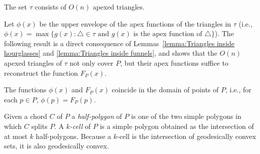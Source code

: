 \documentclass[a4paper,UKenglish]{lipics}
\newcommand{\F}[2]{\ensuremath{F_{\scriptscriptstyle #1}(#2)}}
\newcommand{\fn}[2]{\ensuremath{S_{\scriptscriptstyle #1}(#2)}}
\newcommand{\ff}[1]{\ensuremath{f(#1)}}
\newcommand{\g}[2]{\ensuremath{|\pi(#1, #2)|}}
\begin{document}
\begin{corollary}\label{lemma:Size of tau}
The set $\tau$ consists of $O(n)$ apexed triangles.
\end{corollary}

Let $\phi(x)$ be the upper envelope of the apex functions of the triangles in $\tau$ (i.e., $\phi(x) = \max\{g(x) : \triangle \in \tau\text{ and $g(x)$ is the apex function of $\triangle$} \}$). The following result is a direct consequence of Lemmas~\ref{lemma:Triangles inside hourglasses} and \ref{lemma:Triangles inside funnels}, and shows that the $O(n)$ apexed triangles of $\tau$ not only cover $P$, but their apex functions suffice to reconstruct the function $\F{P}{x}$.

\begin{lemma}\label{lemma:Optimization problem same as geodesic center}
The functions $\phi(x)$ and $\F{P}{x}$ coincide in the domain of points of $P$, i.e., for each $p\in P$, $\phi(p) = \F{P}{p}$.
\end{lemma}



Given a chord $C$ of $P$ a \emph{half-polygon} of $P$ is one of the two simple polygons in which $C$ splits $P$.
A \emph{$k$-cell} of $P$ is a simple polygon obtained as the intersection of at most $k$ half-polygons.
Because a $k$-cell is the intersection of geodesically convex sets, it is also geodesically convex. 
\end{document}
